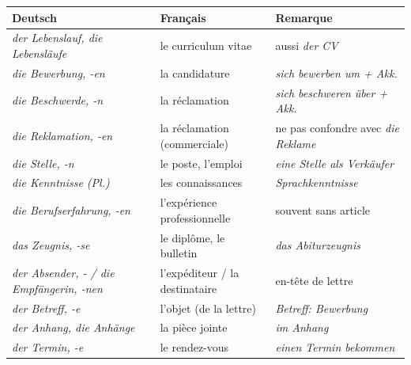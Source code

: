 \documentclass[11pt]{article}
\newcommand{\all}[1]{\ifmmode\text{\textit{#1}}\else\begingroup\selectlanguage{ngerman}\itshape #1\endgroup\fi}
\begin{document}
\begin{definition}
\begin{center}
\begin{tabularx}{\linewidth}{|X|X|X|}\hline
\rowcolor{popblueL} Deutsch & Français & Remarque \\ \hline
\all{der Lebenslauf, die Lebensläufe} & le curriculum vitae & aussi \all{der CV} \\ \hline
\all{die Bewerbung, -en} & la candidature & \all{sich bewerben um + Akk.} \\ \hline
\all{die Beschwerde, -n} & la réclamation & \all{sich beschweren über + Akk.} \\ \hline
\all{die Reklamation, -en} & la réclamation (commerciale) & ne pas confondre avec \all{die Reklame} \\ \hline
\all{die Stelle, -n} & le poste, l'emploi & \all{eine Stelle als Verkäufer} \\ \hline
\all{die Kenntnisse (Pl.)} & les connaissances & \all{Sprachkenntnisse} \\ \hline
\all{die Berufserfahrung, -en} & l'expérience professionnelle & souvent sans article \\ \hline
\all{das Zeugnis, -se} & le diplôme, le bulletin & \all{das Abiturzeugnis} \\ \hline
\all{der Absender, - / die Empfängerin, -nen} & l'expéditeur / la destinataire & en-tête de lettre \\ \hline
\all{der Betreff, -e} & l'objet (de la lettre) & \all{Betreff: Bewerbung} \\ \hline
\all{der Anhang, die Anhänge} & la pièce jointe & \all{im Anhang} \\ \hline
\all{der Termin, -e} & le rendez-vous & \all{einen Termin bekommen} \\ \hline
\end{tabularx}
\end{center}
\end{definition}
\end{document}
